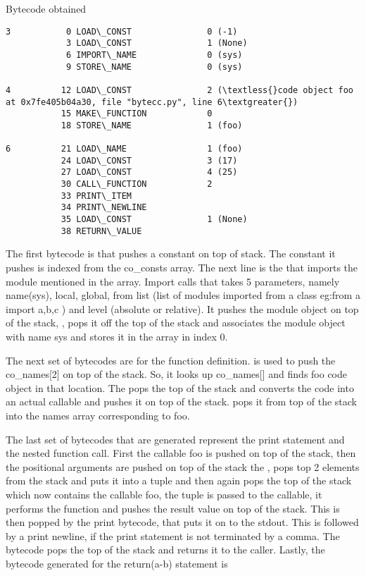 \documentclass[letterpaper,10pt,dutch]{sphinxmanual}
\begin{document}
Bytecode obtained

\begin{Verbatim}[commandchars=\\\{\}]
3           0 LOAD\_CONST               0 (-1)
            3 LOAD\_CONST               1 (None)
            6 IMPORT\_NAME              0 (sys)
            9 STORE\_NAME               0 (sys)

4          12 LOAD\_CONST               2 (\textless{}code object foo at 0x7fe405b04a30, file "bytecc.py", line 6\textgreater{})
           15 MAKE\_FUNCTION            0
           18 STORE\_NAME               1 (foo)

6          21 LOAD\_NAME                1 (foo)
           24 LOAD\_CONST               3 (17)
           27 LOAD\_CONST               4 (25)
           30 CALL\_FUNCTION            2
           33 PRINT\_ITEM
           34 PRINT\_NEWLINE
           35 LOAD\_CONST               1 (None)
           38 RETURN\_VALUE
\end{Verbatim}

The first bytecode is  that pushes a constant on top of stack. The constant it pushes is indexed from the co\_consts array. The next line is the  that imports the module mentioned in the  array. Import calls   that takes 5 parameters, namely name(sys), local, global, from list (list of modules imported from a class eg:from a import a,b,c ) and level (absolute or relative). It pushes the module object on top of the stack, , pops it off the top of the stack and associates the module object with name sys and stores it in the  array in index 0.

The next set of bytecodes are for the function definition.  is used to push the co\_names{[}2{]} on top of the stack. So, it looks up co\_names{[}{]} and finds foo code object in that location. The  pops the top of the stack and converts the code into an actual callable and pushes it on top of the stack.  pops it from top of the stack into the names array corresponding to foo.

The last set of bytecodes that are generated represent the print statement and the nested function call. First the callable foo is pushed on top of the stack, then the positional arguments are pushed on top of the stack the , pops top 2 elements from the stack and puts it into a tuple and then again pops the top of the stack which now contains the callable foo, the tuple is passed to the callable, it performs the function and pushes the result value on top of the stack. This is then popped by the print bytecode, that puts it on to the stdout. This is followed by a print newline, if the print statement is not terminated by a comma.  The  bytecode pops the top of the stack and returns it to the caller.
Lastly, the bytecode generated for the return(a-b) statement is
\end{document}
